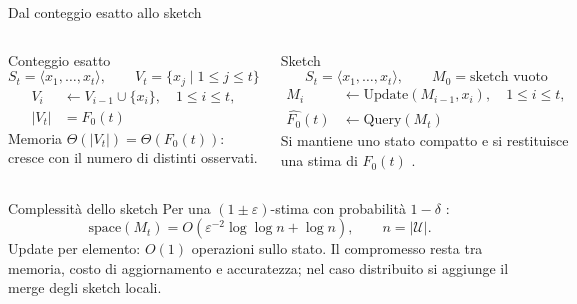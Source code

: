 \documentclass[aspectratio=169,11pt]{beamer}
\newcommand{\Fzero}{F_0}
\begin{document}
\begin{frame}{Dal conteggio esatto allo sketch}
  \begin{columns}[T,totalwidth=\textwidth]
      \begin{block}{Conteggio esatto}
        \footnotesize
        \[
          S_t=\langle x_1,\dots,x_t\rangle,
          \qquad
          V_t=\{x_j \mid 1\le j\le t\}
        \]
        \[
          \begin{aligned}
            V_i &\leftarrow V_{i-1}\cup\{x_i\},\quad 1\le i\le t,\\
            |V_t|&=\Fzero(t)
          \end{aligned}
        \]
        \small
        Memoria \(\Theta(|V_t|)=\Theta(\Fzero(t))\): cresce con il numero di distinti osservati.
      \end{block}
      \begin{block}{Sketch}
        \footnotesize
        \[
          S_t=\langle x_1,\dots,x_t\rangle,
          \qquad
          M_0=\text{sketch vuoto}
        \]
        \[
          \begin{aligned}
            M_i &\leftarrow \mathrm{Update}(M_{i-1},x_i),\quad 1\le i\le t,\\
            \widehat{\Fzero}(t)&\leftarrow \mathrm{Query}(M_t)
          \end{aligned}
        \]
        \small
        Si mantiene uno stato compatto e si restituisce una stima di \(\Fzero(t)\) \cite{Cormode_2017}.
      \end{block}
  \end{columns}

  \vspace{-0.02cm}

  \begin{alertblock}{Complessit\`a dello sketch}
    \footnotesize
    Per una \((1\pm\varepsilon)\)-stima con probabilit\`a \(1-\delta\) \cite{Kane_Nelson_Woodruff_2010}:
    \[
      \mathrm{space}(M_t)=
      O\!\left(\varepsilon^{-2}\log\log n+\log n\right),
      \qquad n=|\mathcal{U}|.
    \]
    Update per elemento: \(O(1)\) operazioni sullo stato. Il compromesso resta tra memoria,
    costo di aggiornamento e accuratezza; nel caso distribuito si aggiunge il merge degli sketch locali.
  \end{alertblock}
\end{frame}
\end{document}

